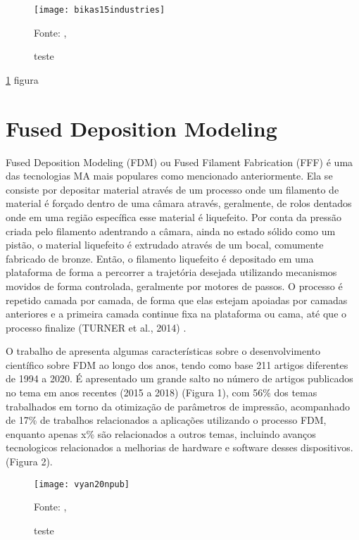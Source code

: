 \begin{figure}[!htb]
    \begin{center}
    \caption{teste}
    \texttt{[image: bikas15industries]}

    {\footnotesize Fonte: \citeauthor{bikas16}, \citeyear{bikas16}}
    \label{fig:label}
    \end{center}
\end{figure}

\ref{fig:label} figura

\section{Fused Deposition Modeling}
Fused Deposition Modeling (FDM) ou Fused Filament Fabrication 
(FFF) é uma das tecnologias MA mais populares como mencionado anteriormente.
Ela se consiste por depositar material através de um processo 
onde um filamento de material é forçado dentro de uma câmara através,
geralmente, de rolos dentados onde em uma região específica esse 
material é liquefeito. Por conta da pressão criada pelo filamento 
adentrando a câmara, ainda no estado sólido como um pistão, 
o material liquefeito é extrudado através de um bocal, 
comumente fabricado de bronze. Então, o filamento liquefeito é 
depositado em uma plataforma de forma a percorrer a trajetória 
desejada utilizando mecanismos movidos de forma controlada, 
geralmente por motores de passos. O processo é repetido camada 
por camada, de forma que elas estejam apoiadas por camadas 
anteriores e a primeira camada continue fixa na plataforma ou 
cama, até que o processo finalize (TURNER et al., 2014) \cite{turner14}.

O trabalho de \cite{vyavahare20} apresenta algumas 
características sobre o desenvolvimento científico sobre 
FDM ao longo dos anos, tendo como base 211 artigos diferentes 
de 1994 a 2020. É apresentado um grande salto no número de 
artigos publicados no tema em anos recentes (2015 a 2018) 
(Figura 1), com 56\% dos temas trabalhados em torno da 
otimização de parâmetros de impressão, acompanhado de 17\% de 
trabalhos relacionados a aplicações utilizando o processo FDM, enquanto apenas x\%
são relacionados a outros temas, incluindo avanços tecnologicos relacionados
a melhorias de hardware e software desses dispositivos.
(Figura 2).

\begin{figure}[!htb]
    \centering
    \caption{teste}
    \texttt{[image: vyan20npub]}
    
    {\footnotesize Fonte: \citeauthor{vyavahare20}, \citeyear{vyavahare20}}
    \label{fig:label2}
\end{figure}

